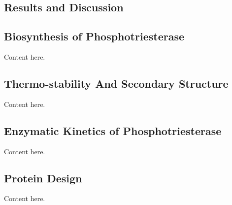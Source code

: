\begin{refsection}
\section{Results and Discussion}

\subsection{Biosynthesis of Phosphotriesterase}

Content here.

\subsection{Thermo-stability And Secondary Structure}

Content here.

\subsection{Enzymatic Kinetics of Phosphotriesterase}

Content here.

\subsection{Protein Design}

Content here.

\printbibliography[heading=subbibliography]

\end{refsection}
